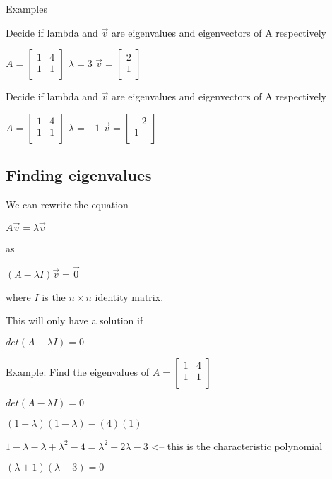 \documentclass{extarticle}
\begin{document}
\begin{multicols}{2}
Examples

Decide if lambda and $\vec{v}$ are eigenvalues and eigenvectors of A respectively

$A=\left[\begin{matrix}1&4\\1&1\\\end{matrix}\right]$	$\lambda=3$	$\vec{v}=\left[\begin{matrix}2\\1\\\end{matrix}\right]$

Decide if lambda and $\vec{v}$ are eigenvalues and eigenvectors of A respectively

$A=\left[\begin{matrix}1&4\\1&1\\\end{matrix}\right]$	$\lambda=-1$	$\vec{v}=\left[\begin{matrix}-2\\1\\\end{matrix}\right]$



\subsection{Finding eigenvalues}
We can rewrite the equation

$A\vec{v}=\lambda\vec{v}$

as

$\left(A-\lambda I\right)\vec{v}=\vec{0}$

where $I$ is the $n\times n$ identity matrix.

This will only have a solution if

$det\left(A-\lambda I\right)=0$

Example: Find the eigenvalues of $A=\left[\begin{matrix}1&4\\1&1\\\end{matrix}\right]$

$det\left(A-\lambda I\right)=0$

$(1-\lambda)(1-\lambda)-(4)(1)$

$1-\lambda-\lambda+\lambda^2-4=\lambda^2-2\lambda-3$ <-- this is the characteristic polynomial

$(\lambda+1)(\lambda-3)=0$


\end{multicols}
\end{document}
